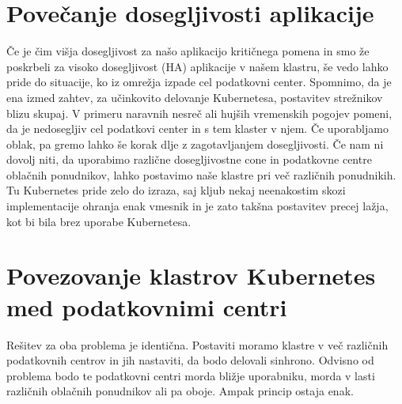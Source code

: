 \documentclass[a4paper, 12pt]{book}
\begin{document}
\section{Povečanje dosegljivosti aplikacije}
Če je čim višja dosegljivost za našo aplikacijo kritičnega pomena in smo že poskrbeli za visoko dosegljivost (HA) aplikacije v našem klastru, še vedo lahko pride do situacije, ko iz omrežja izpade cel podatkovni center.
Spomnimo, da je ena izmed zahtev, za učinkovito delovanje Kubernetesa, postavitev strežnikov blizu skupaj.
V primeru naravnih nesreč ali hujših vremenskih pogojev pomeni, da je nedosegljiv cel podatkovi center in s tem klaster v njem.
Če uporabljamo oblak, pa gremo lahko še korak dlje z zagotavljanjem dosegljivosti.
Če nam ni dovolj niti, da uporabimo različne dosegljivostne cone in podatkovne centre oblačnih ponudnikov, lahko postavimo naše klastre pri več različnih ponudnikih.
Tu Kubernetes pride zelo do izraza, saj kljub nekaj neenakostim skozi implementacije ohranja enak vmesnik in je zato takšna postavitev precej lažja, kot bi bila brez uporabe Kubernetesa.
\section{Povezovanje klastrov Kubernetes med podatkovnimi centri}
Rešitev za oba problema je identična.
Postaviti moramo klastre v več različnih podatkovnih centrov in jih nastaviti, da bodo delovali sinhrono.
Odvisno od problema bodo te podatkovni centri morda bližje uporabniku, morda v lasti različnih oblačnih ponudnikov ali pa oboje.
Ampak princip ostaja enak.
\end{document}
